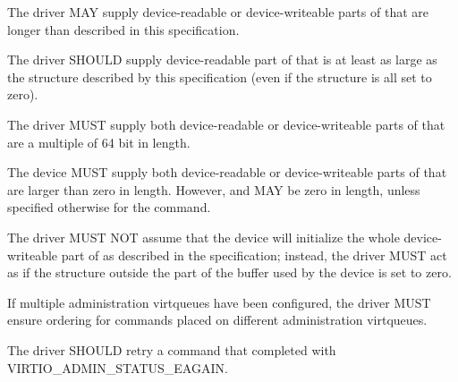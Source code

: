 The driver MAY supply device-readable or device-writeable parts
of  that are longer than described in
this specification.

The driver SHOULD supply device-readable part of
 that is at least as
large as the structure described by this specification
(even if the structure is all set to zero).

The driver MUST supply both device-readable or device-writeable parts
of  that are a multiple of 64 bit
in length.

The device MUST supply both device-readable or device-writeable parts
of  that are larger than zero in
length. However,  and
 MAY be zero in length, unless
specified otherwise for the command.

The driver MUST NOT assume that the device will initialize the whole
device-writeable part of  as described in the specification; instead,
the driver MUST act as if the structure
outside the part of the buffer used by the device
is set to zero.

If multiple administration virtqueues have been configured,
the driver MUST ensure ordering for commands
placed on different administration virtqueues.

The driver SHOULD retry a command that completed with
 VIRTIO_ADMIN_STATUS_EAGAIN.
